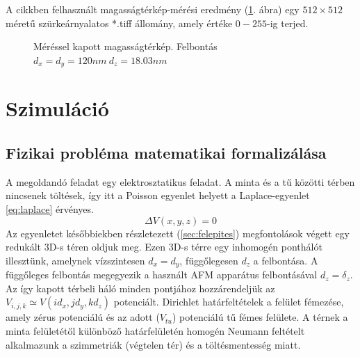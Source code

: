 	A cikkben felhasznált magasságtérkép-mérési eredmény (\ref{fig:felulet}. ábra) egy
	$512\times512$ méretű szürkeárnyalatos *.tiff állomány, amely értéke $0-255$-ig terjed.
	
	\begin{figure}[!t]
		\centering
		\hfil
		\caption{\scriptsize Méréssel kapott magasságtérkép. Felbontás $d_x=d_y=120nm \ d_z=18.03nm$}
		\label{fig:felulet}
	\end{figure}
	
	
	
\section{Szimuláció}
\subsection{Fizikai probléma matematikai formalizálása}
	
	A megoldandó feladat egy elektrosztatikus feladat.
	A minta és a tű közötti térben nincsenek töltések, így itt a Poisson egyenlet helyett a
	Laplace-egyenlet \eqref{eq:laplace} érvényes.
	\begin{equation}\label{eq:laplace}
		\Delta V(x,y,z) = 0 
	\end{equation}
	Az egyenletet későbbiekben részletezett (\ref{sec:felepites}) megfontolások végett egy redukált
	3D-s téren oldjuk meg.
	Ezen 3D-s térre egy inhomogén ponthálót illesztünk, amelynek vízszintesen $d_x = d_y$,
	függőlegesen $d_z$ a felbontása. A függőleges felbontás megegyezik a használt AFM apparátus
	felbontásával $d_z = \delta_z$.
	Az így kapott térbeli háló minden pontjához hozzárendeljük az $V_{i,j,k} \simeq V(id_x,jd_y,kd_z)$
	potenciált.
	Dirichlet határfeltételek a felület fémezése, amely zérus potenciálú és az adott ($V_{tu}$)
	potenciálú  tű fémes felülete.
	A térnek a minta felületétől különböző határfelületén homogén Neumann feltételt alkalmazunk
	a szimmetriák (végtelen tér) és a töltésmentesség miatt.
	
